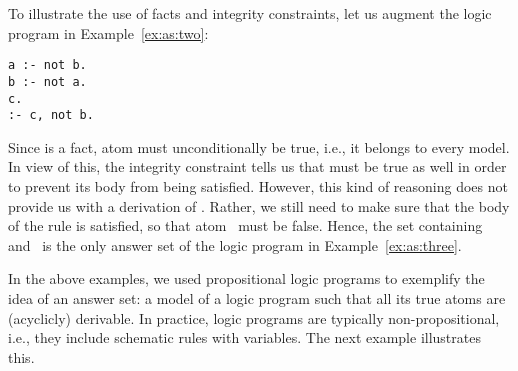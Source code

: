 \begin{example}\label{ex:as:three}
To illustrate the use of facts and integrity constraints,
let us augment the logic program in Example~\ref{ex:as:two}:
\begin{lstlisting}[numbers=none]
a :- not b.
b :- not a.
c.
:- c, not b.
\end{lstlisting}
Since  is a fact,
atom  must unconditionally be true, i.e.,
it belongs to every model.
In view of this,
the integrity constraint 
tells us that  must be true as well
in order to prevent its body from being satisfied.
However, this kind of reasoning does not provide us with
a derivation of .
Rather, we still need to make sure that the body
of the rule  is satisfied,
so that atom~ must be false.
Hence, the set containing  and~
is the only answer set of the logic program
in Example~\ref{ex:as:three}.
\eexample
\end{example}

In the above examples, 
we used propositional logic programs to exemplify the idea
of an answer set: a model of a logic program such that all its true atoms are 
(acyclicly) derivable.
In practice, logic programs are typically non-propositional, i.e.,
they include schematic rules with variables.
The next example illustrates this.

